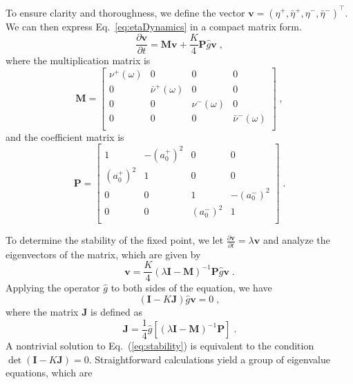 \documentclass{article}
\begin{document}
To ensure clarity and thoroughness, we define the vector $\mathbf{v}=\left( \eta ^+,\bar{\eta}^+,\eta ^-,\bar{\eta}^- \right)^{\top} $. 
We can then express Eq.~\eqref{eq:etaDynamics} in a compact matrix form.
\begin{equation}
    \label{eq:matrixDynamics}
    \frac{\partial \mathbf{v}}{\partial t}=\mathbf{M}\mathbf{v}+\frac{K}{4}\mathbf{P}\hat{g}\mathbf{v}\;,
\end{equation}
where the multiplication matrix is
\begin{equation}
    \mathbf{M}=\left[ \begin{matrix}
        \nu ^+\left( \omega \right)&		0&		0&		0\\
        0&		\bar{\nu}^+\left( \omega \right)&		0&		0\\
        0&		0&		\nu ^-\left( \omega \right)&		0\\
        0&		0&		0&		\bar{\nu}^-\left( \omega \right)\\
    \end{matrix} \right] \;,
\end{equation}
and the coefficient matrix is
\begin{equation}
    \mathbf{P}=\left[ \begin{matrix}
        1&		-\left( a_{0}^{+} \right) ^2&		0&		0\\
        \left( a_{0}^{+} \right) ^2&		1&		0&		0\\
        0&		0&		1&		-\left( a_{0}^{-} \right) ^2\\
        0&		0&		\left( a_{0}^{-} \right) ^2&		1\\
    \end{matrix} \right] \;.
\end{equation}

To determine the stability of the fixed point, we let $
\frac{\partial \mathbf{v}}{\partial t}=\lambda \mathbf{v}
$ and analyze the eigenvectors of the matrix, which are given by
\begin{equation}
    \mathbf{v}=\frac{K}{4}\left( \lambda \mathbf{I}-\mathbf{M} \right) ^{-1}\mathbf{P}\hat{g}\mathbf{v}\;.
\end{equation}
Applying the operator $\hat{g}$ to both sides of the equation, we have
\begin{equation}
    \label{eq:stability}
    \left( \mathbf{I}-K\mathbf{J} \right) \hat{g}\mathbf{v}=0\;,
\end{equation}
where the matrix $\mathbf{J}$ is defined as
\begin{equation}
    \mathbf{J}=\frac{1}{4}\hat{g}\left[ \left( \lambda \mathbf{I}-\mathbf{M} \right) ^{-1}\mathbf{P} \right]\;.
\end{equation}
A nontrivial solution to Eq.~(\ref{eq:stability}) is equivalent to the condition $\det \left( \mathbf{I}-K\mathbf{J} \right) =0$. Straightforward calculations yield a group of eigenvalue equations, which are
\end{document}
